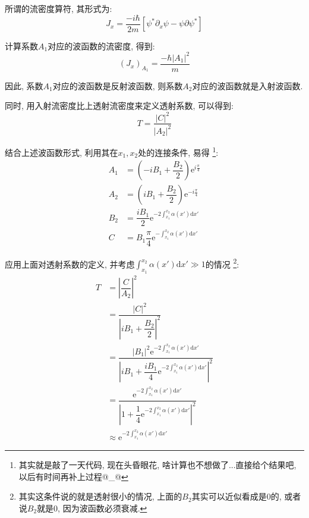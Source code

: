 \documentclass[a4paper, 11pt]{article}
\begin{document}
\begin{spacing}{1.2}
         所谓的流密度算符, 其形式为:
         \begin{equation}
           J_x = \dfrac{-i\hbar}{2m}\left[\psi^*\partial_x\psi-\psi\partial\psi^*\right]
         \end{equation}

         计算系数$A_1$对应的波函数的流密度, 得到:
         \begin{equation}
           (J_x)_{A_1} = \dfrac{-\hbar|A_1|^2}{m}
         \end{equation}

         因此, 系数$A_1$对应的波函数是反射波函数, 则系数$A_2$对应的波函数就是入射波函数. 

         同时, 用入射流密度比上透射流密度来定义透射系数, 可以得到:
         \begin{equation}
           T = \dfrac{|C|^2}{|A_2|^2}
         \end{equation}

         结合上述波函数形式, 利用其在$x_1, x_2$处的连接条件, 易得%
         \footnote{其实就是敲了一天代码, 现在头昏眼花, 啥计算也不想做了...直接给个结果吧, 以后有时间再补上过程@\_@}:
        \begin{equation}
          \begin{aligned}
            A_1 &= \left(-iB_1+\dfrac{B_2}{2}\right)\mathrm{e}^{i\frac{\pi}{4}}\\
            A_2 &= \left(iB_1+\dfrac{B_2}{2}\right)\mathrm{e}^{-i\frac{\pi}{4}}\\
            B_2 &= \dfrac{iB_1}{2}\mathrm{e}^{-2\int_{x_1}^{x_2}\alpha(x')\mathrm{d}x'}\\
            C &=  B_1\dfrac{\pi}{4}\mathrm{e}^{-\int_{x_1}^{x_2}\alpha(x')\mathrm{d}x'}
          \end{aligned}
        \end{equation}

        应用上面对透射系数的定义, 并考虑$\int_{x_1}^{x_2}\alpha(x')\mathrm{d}x'\gg1$的情况%
        \footnote{其实这条件说的就是透射很小的情况, 上面的$B_2$其实可以近似看成是0的, 或者说$B_2$就是0, 因为波函数必须衰减.}:
        \begin{equation}
          \begin{aligned}
            T &= \left|\dfrac{C}{A_2}\right|^2\\
              &= \dfrac{|C|^2}{\left|iB_1+\dfrac{B_2}{2}\right|^2}\\
              &= \dfrac{|B_1|^2\mathrm{e}^{-2\int_{x_1}^{x_2}\alpha(x')\mathrm{d}x'}}%
                 {\left|iB_1+\dfrac{iB_1}{4}\mathrm{e}^{-2\int_{x_1}^{x_2}\alpha(x')\mathrm{d}x'}\right|^2}\\
              &= \dfrac{\mathrm{e}^{-2\int_{x_1}^{x_2}\alpha(x')\mathrm{d}x'}}%
                 {\left|1+\dfrac{1}{4}\mathrm{e}^{-2\int_{x_1}^{x_2}\alpha(x')\mathrm{d}x'}\right|^2}\\
              &\approx \mathrm{e}^{-2\int_{x_1}^{x_2}\alpha(x')\mathrm{d}x'}
          \end{aligned}
        \end{equation}


\end{spacing}
\end{document}
